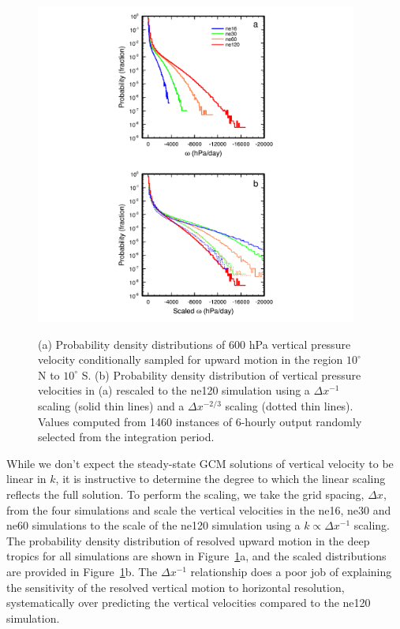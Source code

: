 \begin{figure}
\begin{center}
\noindent\includegraphics[width=25pc,angle=0]{chapter2/figure7.pdf}\\
\end{center}
\caption{(a) Probability density distributions of 600 hPa vertical pressure velocity conditionally sampled for upward motion in the region $10^{\circ}$ N to $10^{\circ}$ S. (b) Probability density distribution of vertical pressure velocities in (a) rescaled to the ne120 simulation using a $\Delta x^{-1}$ scaling (solid thin lines) and a $\Delta x^{-2/3}$ scaling (dotted thin lines). Values computed from 1460 instances of 6-hourly output randomly selected from the integration period.}
\label{fig:figure2-7}
\end{figure}

While we don’t expect the steady-state GCM solutions of vertical velocity to be linear in $k$, it is instructive to determine the degree to which the linear scaling reflects the full solution. To perform the scaling, we take the grid spacing, $\Delta x$, from the four simulations and scale the vertical velocities in the ne16, ne30 and ne60 simulations to the scale of the ne120 simulation using a $k \propto \Delta x^{-1}$ scaling. The probability density distribution of resolved upward motion in the deep tropics for all simulations are shown in Figure~\ref{fig:figure2-7}a, and the scaled distributions are provided in Figure~\ref{fig:figure2-7}b. The $\Delta x^{-1}$ relationship does a poor job of explaining the sensitivity of the resolved vertical motion to horizontal resolution, systematically over predicting the vertical velocities compared to the ne120 simulation.

